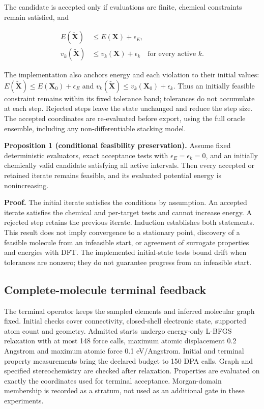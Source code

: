 \documentclass[11pt,a4paper]{article}
\begin{document}
The candidate is accepted only if evaluations are finite, chemical
constraints remain satisfied, and

\[
\begin{aligned}
E(\widetilde{\mathbf X})&\leq E(\mathbf X)+\epsilon_E,\\
v_k(\widetilde{\mathbf X})&\leq v_k(\mathbf X)+\epsilon_k \quad\text{for every active }k.
\end{aligned}
\]

The implementation also anchors energy and each violation to their
initial values:
\(E(\widetilde{\mathbf X})\leq E(\mathbf X_0)+\epsilon_E\) and
\(v_k(\widetilde{\mathbf X})\leq v_k(\mathbf X_0)+\epsilon_k\). Thus an
initially feasible constraint remains within its fixed tolerance band;
tolerances do not accumulate at each step. Rejected steps leave the
state unchanged and reduce the step size. The accepted coordinates are
re-evaluated before export, using the full oracle ensemble, including
any non-differentiable stacking model.

\textbf{Proposition 1 (conditional feasibility preservation).} Assume
fixed deterministic evaluators, exact acceptance tests with
\(\epsilon_E=\epsilon_k=0\), and an initially chemically valid candidate
satisfying all active intervals. Then every accepted or retained iterate
remains feasible, and its evaluated potential energy is nonincreasing.

\textbf{Proof.} The initial iterate satisfies the conditions by
assumption. An accepted iterate satisfies the chemical and per-target
tests and cannot increase energy. A rejected step retains the previous
iterate. Induction establishes both statements. This result does not
imply convergence to a stationary point, discovery of a feasible
molecule from an infeasible start, or agreement of surrogate properties
and energies with DFT. The implemented initial-state tests bound drift
when tolerances are nonzero; they do not guarantee progress from an
infeasible start.

\FloatBarrier
\subsection{Complete-molecule terminal
feedback}\label{complete-molecule-terminal-feedback}

The terminal operator keeps the sampled elements and inferred molecular
graph fixed. Initial checks cover connectivity, closed-shell electronic
state, supported atom count and geometry. Admitted starts undergo
energy-only L-BFGS relaxation with at most 148 force calls, maximum
atomic displacement 0.2 Angstrom and maximum atomic force 0.1
eV/Angstrom. Initial and terminal property measurements bring the
declared budget to 150 DPA calls. Graph and specified stereochemistry
are checked after relaxation. Properties are evaluated on exactly the
coordinates used for terminal acceptance. Morgan-domain membership is
recorded as a stratum, not used as an additional gate in these
experiments.
\end{document}
